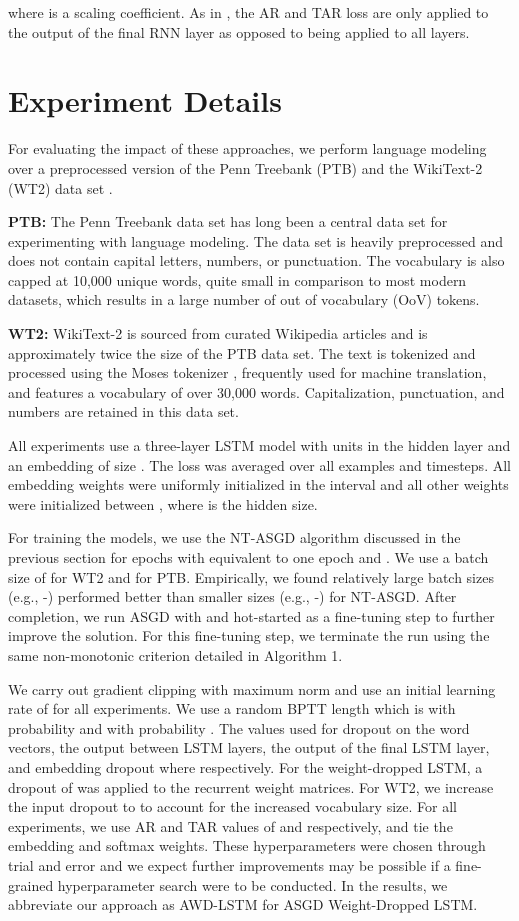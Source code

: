 \documentclass{article}
\begin{document}
where  is a scaling coefficient.
As in \citet{smerity-revisiting}, the AR and TAR loss are only applied to the output of the final RNN layer as opposed to being applied to all layers.

\section{Experiment Details}

For evaluating the impact of these approaches, we perform language modeling over a preprocessed version of the Penn Treebank (PTB) \citep{Mikolov2010} and the WikiText-2 (WT2) data set \citep{Merity2016}.

\textbf{PTB:} The Penn Treebank data set has long been a central data set for experimenting with language modeling.
The data set is heavily preprocessed and does not contain capital letters, numbers, or punctuation.
The vocabulary is also capped at 10,000 unique words, quite small in comparison to most modern datasets, which results in a large number of out of vocabulary (OoV) tokens. 

\textbf{WT2:} WikiText-2 is sourced from curated Wikipedia articles and is approximately twice the size of the PTB data set.
The text is tokenized and processed using the Moses tokenizer \citep{Koehn2007MosesOS}, frequently used for machine translation, and features a vocabulary of over 30,000 words.
Capitalization, punctuation, and numbers are retained in this data set.

All experiments use a three-layer LSTM model with  units in the hidden layer and
an embedding of size . The loss was averaged over all examples and timesteps.
All embedding weights were uniformly initialized in the interval  and all other weights were initialized between , where  is the hidden size.

For training the models, we use the NT-ASGD algorithm discussed in the previous section for  epochs with  equivalent to one epoch and . We use a batch size of  for WT2 and  for PTB. Empirically, we found relatively large batch sizes (e.g., -) performed better than smaller sizes (e.g., -) for NT-ASGD. After completion, we run ASGD with  and hot-started  as a fine-tuning step to further improve the solution. For this fine-tuning step, we terminate the run using the same non-monotonic criterion detailed in Algorithm 1.

We carry out gradient clipping with maximum norm  and use an initial learning rate of  for all experiments.
We use a random BPTT length which is  with probability  and  with probability .
The values used for dropout on the word vectors, the output between LSTM layers, the output of the final LSTM layer, and embedding dropout where  respectively.
For the weight-dropped LSTM, a dropout of  was applied to the recurrent weight matrices.
For WT2, we increase the input dropout to  to account for the increased vocabulary size.
For all experiments, we use AR and TAR values of  and  respectively, and tie the embedding and softmax weights.
These hyperparameters were chosen through trial and error and we expect further improvements may be possible if a fine-grained hyperparameter search were to be conducted.
In the results, we abbreviate our approach as AWD-LSTM for ASGD Weight-Dropped LSTM.
\end{document}
